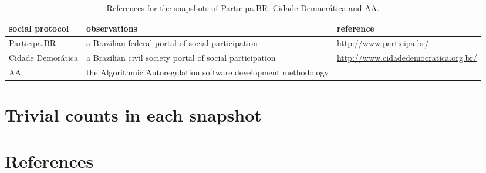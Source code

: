 \documentclass[review]{elsarticle}
\begin{document}
\begin{table*}[h!]\scriptsize
\begin{center}
\caption{References for the snapshots of
Participa.BR, Cidade Democrática and AA.}\label{tab:provenance}
\begin{tabular}{| l || p{4cm} | p{3cm} | }\hline
    \textbf{social protocol} & \textbf{observations} & \textbf{reference} \\\hline\hline
    Participa.BR & a Brazilian federal portal of social participation & \url{http://www.participa.br/} \\\hline
    Cidade Demorática & a Brazilian civil society portal of social participation & \url{http://www.cidadedemocratica.org.br/} \\\hline
    AA & the Algorithmic Autoregulation software development methodology & \cite{aarticle} \\\hline
\end{tabular}\end{center}
\end{table*}                    


\clearpage
\section{Trivial counts in each snapshot}





\clearpage


\section*{References}

%

%
%
\end{document}
